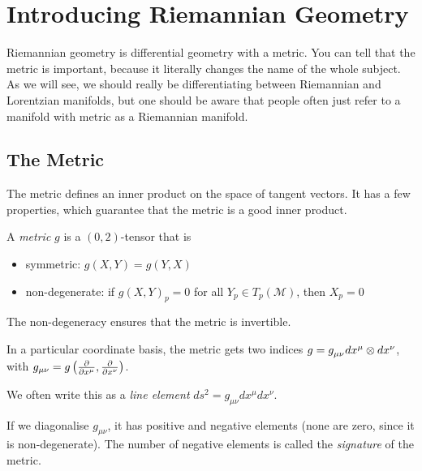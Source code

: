 \chapter{Introducing Riemannian Geometry}%
\label{cha:introducing_riemannian_geometry}

Riemannian geometry is differential geometry with a metric. You can tell that the metric is important, because it literally changes the name of the whole subject. As we will see, we should really be differentiating between Riemannian and Lorentzian manifolds, but one should be aware that people often just refer to a manifold with metric as a Riemannian manifold.

\section{The Metric}%
\label{sec:the_metric}

The metric defines an inner product on the space of tangent vectors.
It has a few properties, which guarantee that the metric is a good inner product.
\begin{definition}[metric]
  A \emph{metric} $g$ is a $(0,2)$-tensor that is
  \begin{itemize}
    \item symmetric: $g(X, Y) = g(Y, X)$
    \item non-degenerate: if $g(X, Y)_p = 0$ for all $Y_p \in T_p(\mathcal{M})$, then $X_p = 0$
  \end{itemize}
\end{definition}
\begin{leftbar}
  \begin{remark}
    The non-degeneracy ensures that the metric is invertible.
  \end{remark}
\end{leftbar}
In a particular coordinate basis, the metric gets two indices $g = g \indices{_\mu_\nu} dx^\mu \otimes dx^\nu$, with $g_{\mu \nu} = g \left( \pdv{}{x^\mu}, \pdv{}{x^\nu} \right)$.
\begin{notation}[]
  We often write this as a \emph{line element} $ds^2 = g_{\mu\nu} dx^\mu dx^\nu$.
\end{notation}
\begin{definition}[signature]
  If we diagonalise $g_{\mu\nu}$, it has positive and negative elements (none are zero, since it is non-degenerate). The number of negative elements is called the \emph{signature} of the metric.
\end{definition}

